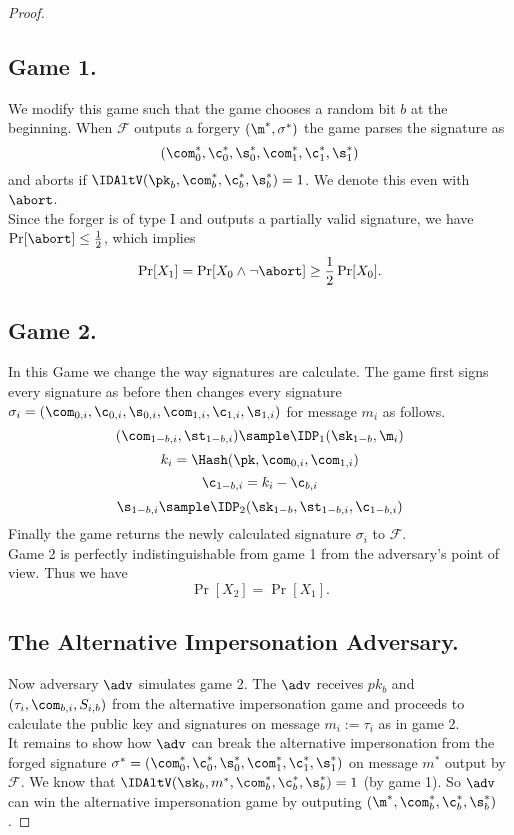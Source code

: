 \begin{proof}
\subsection*{Game 1.}
We modify this game such that the game chooses a random bit $b$ at the beginning. When $\mathcal{F}$ outputs a forgery  $(\m^*, \sigma^*)$ the game parses the signature as 
$$(\com^*_{0},\c^*_{0},\s^*_{0}, \com^*_{1}, \c^*_{1},\s^*_{1})$$
 and aborts if 
$\IDAltV(\pk_b,\com^*_b,\c^*_b,\s^*_b) =1$. We denote this even with $\abort$.
\\
Since the forger is of type I and outputs a partially valid signature, we have
$\Pr[\abort] \leq \frac{1}{2}$, which implies
$$\Pr[X_1] = \Pr[X_0 \land \neg \abort] \geq \frac{1}{2} \Pr[X_0].$$

\subsection*{Game 2.}
In this Game we change the way signatures are calculate.
The game first signs every signature as before then changes every signature $\sigma_i = (\com_{0,i},\c_{0,i},\s_{0,i}, \com_{1,i}, \c_{1,i},\s_{1,i})$ for message $m_i$ as follows.
$$(\com_{1-b,i},\st_{1-b,i})\sample\IDP_1(\sk_{1-b},\m_i)$$
$$ k_i = \Hash(\pk,\com_{0,i},\com_{1,i}) $$
$$\c_{1-b,i} = k_i - \c_{b,i} $$
$$\s_{1-b,i} \sample\IDP_2(\sk_{1-b},\st_{1-b,i},\c_{1-b,i})$$
Finally the game returns the newly calculated signature $\sigma_i$ to $\mathcal{F}$.
\\
Game 2 is perfectly indistinguishable from game 1 from the adversary's point of view. Thus we have
$$\Pr[X_2] = \Pr[X_1].$$

\subsection*{The Alternative Impersonation Adversary.}
Now adversary $\adv$ simulates game 2. The $\adv$ receives $pk_{b}$ and $(\tau_i, \com_{b,i}, S_{i,b})$ from the alternative impersonation game and proceeds to calculate the public key and signatures on message $m_i := \tau_i$ as in game 2.
\\
It remains to show how $\adv$ can break the alternative impersonation from the forged signature
$\sigma^* = (\com^*_{0},\c^*_{0},\s^*_{0}, \com^*_{1}, \c^*_{1},\s^*_{1})$ on message $m^*$ output by $\mathcal{F}$. We know that $\IDAltV(\sk_b,m^*,\com^*_b,\c^*_b,\s^*_b) =1$ (by game 1).  So $\adv$ can win the alternative impersonation game by outputing $(\m^*,\com^*_b,\c^*_b,\s^*_b)$.


\end{proof}

